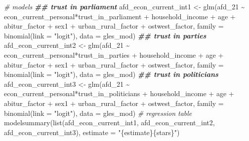 \documentclass[
]{article}
\newenvironment{Shaded}{\begin{snugshade}}{\end{snugshade}}
\newcommand{\AttributeTok}[1]{\textcolor[rgb]{0.77,0.63,0.00}{#1}}
\newcommand{\CommentTok}[1]{\textcolor[rgb]{0.56,0.35,0.01}{\textit{#1}}}
\newcommand{\DocumentationTok}[1]{\textcolor[rgb]{0.56,0.35,0.01}{\textbf{\textit{#1}}}}
\newcommand{\FunctionTok}[1]{\textcolor[rgb]{0.00,0.00,0.00}{#1}}
\newcommand{\NormalTok}[1]{#1}
\newcommand{\OtherTok}[1]{\textcolor[rgb]{0.56,0.35,0.01}{#1}}
\newcommand{\SpecialCharTok}[1]{\textcolor[rgb]{0.00,0.00,0.00}{#1}}
\newcommand{\StringTok}[1]{\textcolor[rgb]{0.31,0.60,0.02}{#1}}
\begin{document}
\begin{Shaded}
\begin{Highlighting}[]
\CommentTok{\# models }
\DocumentationTok{\#\# trust in parliament}
\NormalTok{afd\_econ\_current\_int1 }\OtherTok{\textless{}{-}} \FunctionTok{glm}\NormalTok{(afd\_21 }\SpecialCharTok{\textasciitilde{}}\NormalTok{ econ\_current\_personal}\SpecialCharTok{*}\NormalTok{trust\_in\_parliament }\SpecialCharTok{+}\NormalTok{ household\_income }\SpecialCharTok{+}\NormalTok{ age }\SpecialCharTok{+}\NormalTok{ abitur\_factor }\SpecialCharTok{+}\NormalTok{ sex1 }\SpecialCharTok{+}\NormalTok{ urban\_rural\_factor }\SpecialCharTok{+}\NormalTok{ ostwest\_factor, }
                             \AttributeTok{family =} \FunctionTok{binomial}\NormalTok{(}\AttributeTok{link =} \StringTok{"logit"}\NormalTok{),}
                             \AttributeTok{data =}\NormalTok{ gles\_mod)}
\DocumentationTok{\#\# trust in parties }
\NormalTok{afd\_econ\_current\_int2 }\OtherTok{\textless{}{-}} \FunctionTok{glm}\NormalTok{(afd\_21 }\SpecialCharTok{\textasciitilde{}}\NormalTok{ econ\_current\_personal}\SpecialCharTok{*}\NormalTok{trust\_in\_parties }\SpecialCharTok{+}\NormalTok{ household\_income }\SpecialCharTok{+}\NormalTok{ age }\SpecialCharTok{+}\NormalTok{ abitur\_factor }\SpecialCharTok{+}\NormalTok{ sex1 }\SpecialCharTok{+}\NormalTok{ urban\_rural\_factor }\SpecialCharTok{+}\NormalTok{ ostwest\_factor, }
                             \AttributeTok{family =} \FunctionTok{binomial}\NormalTok{(}\AttributeTok{link =} \StringTok{"logit"}\NormalTok{),}
                             \AttributeTok{data =}\NormalTok{ gles\_mod)}
\DocumentationTok{\#\# trust in politicians}
\NormalTok{afd\_econ\_current\_int3 }\OtherTok{\textless{}{-}} \FunctionTok{glm}\NormalTok{(afd\_21 }\SpecialCharTok{\textasciitilde{}}\NormalTok{ econ\_current\_personal}\SpecialCharTok{*}\NormalTok{trust\_in\_politicians }\SpecialCharTok{+}\NormalTok{ household\_income }\SpecialCharTok{+}\NormalTok{ age }\SpecialCharTok{+}\NormalTok{ abitur\_factor }\SpecialCharTok{+}\NormalTok{ sex1 }\SpecialCharTok{+}\NormalTok{ urban\_rural\_factor }\SpecialCharTok{+}\NormalTok{ ostwest\_factor, }
                             \AttributeTok{family =} \FunctionTok{binomial}\NormalTok{(}\AttributeTok{link =} \StringTok{"logit"}\NormalTok{),}
                             \AttributeTok{data =}\NormalTok{ gles\_mod)}
\CommentTok{\# regression table }
\FunctionTok{modelsummary}\NormalTok{(}\FunctionTok{list}\NormalTok{(afd\_econ\_current\_int1, afd\_econ\_current\_int2, afd\_econ\_current\_int3),}
             \AttributeTok{estimate =} \StringTok{"\{estimate\}\{stars\}"}\NormalTok{)}
\end{Highlighting}
\end{Shaded}
\end{document}

